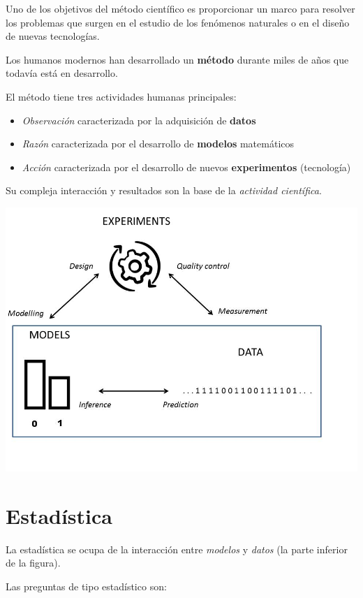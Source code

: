 \documentclass[
]{book}
\providecommand{\tightlist}{%
  \setlength{\itemsep}{0pt}\setlength{\parskip}{0pt}}
\begin{document}
Uno de los objetivos del método científico es proporcionar un marco para resolver los problemas que surgen en el estudio de los fenómenos naturales o en el diseño de nuevas tecnologías.

Los humanos modernos han desarrollado un \textbf{método} durante miles de años que todavía está en desarrollo.

El método tiene tres actividades humanas principales:

\begin{itemize}
\tightlist
\item
  \emph{Observación} caracterizada por la adquisición de \textbf{datos}
\item
  \emph{Razón} caracterizada por el desarrollo de \textbf{modelos} matemáticos
\item
  \emph{Acción} caracterizada por el desarrollo de nuevos \textbf{experimentos} (tecnología)
\end{itemize}

Su compleja interacción y resultados son la base de la \emph{actividad científica}.

\includegraphics{./figures/stats.JPG}

\hypertarget{estaduxedstica}{%
\section{Estadística}\label{estaduxedstica}}

La estadística se ocupa de la interacción entre \emph{modelos} y \emph{datos} (la parte inferior de la figura).

Las preguntas de tipo estadístico son:
\end{document}
